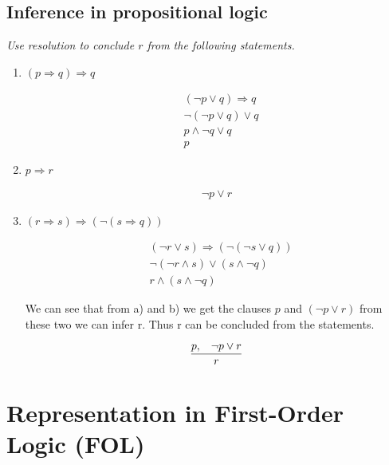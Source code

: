 \subsection{Inference in propositional logic}
\textit{Use resolution to conclude $r$ from the following statements.}

\begin{enumerate}[label=\alph*)]
    \item $ (p \Longrightarrow q) \Longrightarrow q $
    
        \begin{align*}
            & (\neg p \lor q) \Longrightarrow q \\
            & \neg (\neg p \lor q) \lor q \\
            & p \land \neg q \lor q \\
            & p 
        \end{align*}

    \item $ p \Longrightarrow r $ 
    
        \begin{align*}
            \neg p \lor r
        \end{align*}

    \item $ (r \Longrightarrow s) \Longrightarrow (\neg (s \Longrightarrow q)) $

        \begin{align*}
            & (\neg r \lor s) \Longrightarrow (\neg (\neg s \lor q)) \\
            & \neg (\neg r \land s) \lor ( s \land \neg q) \\
            & r \land (s \land \neg q)
        \end{align*}

        We can see that from a) and b) we get the clauses $p$ and $(\neg p \lor r)$ from these two we can infer r. Thus r can be concluded from the statements.
        
        $$\frac{p, \hspace{0.3cm} \neg p \lor r}{r}$$

\end{enumerate}

\newpage

\section{Representation in First-Order Logic (FOL)} 

